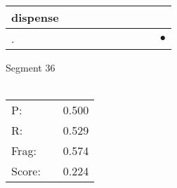 \documentclass[landscape]{article}
\newcommand{\ssp}{\hspace{2pt}}
\newcommand{\mex}{\cellcolor{g}$\bullet$}
\begin{document}
\begin{tabular}{|l|p{10pt}|p{10pt}|p{10pt}|p{10pt}|p{10pt}|p{10pt}|p{10pt}|p{10pt}|p{10pt}|}
\hline
\ssp dispense \ssp&\hspace{2pt}&\hspace{2pt}&\hspace{2pt}&\hspace{2pt}&\hspace{2pt}&\hspace{2pt}&\hspace{2pt}&\hspace{2pt}&\hspace{2pt}\\
\hline
\ssp \cellcolor{ref8}. \ssp&\hspace{2pt}&\hspace{2pt}&\hspace{2pt}&\hspace{2pt}&\hspace{2pt}&\hspace{2pt}&\hspace{2pt}&\hspace{2pt}&\hspace{2pt}\mex\\
\hline
\end{tabular}

\vspace{6pt}
\noindent Segment 36\\\\
\noindent\begin{tabular}{lm{12pt}r}
\hline
P:&&0.500\\
R:&&0.529\\
Frag:&&0.574\\
Score:&&0.224\\
\end{tabular}

\newpage
\end{document}
